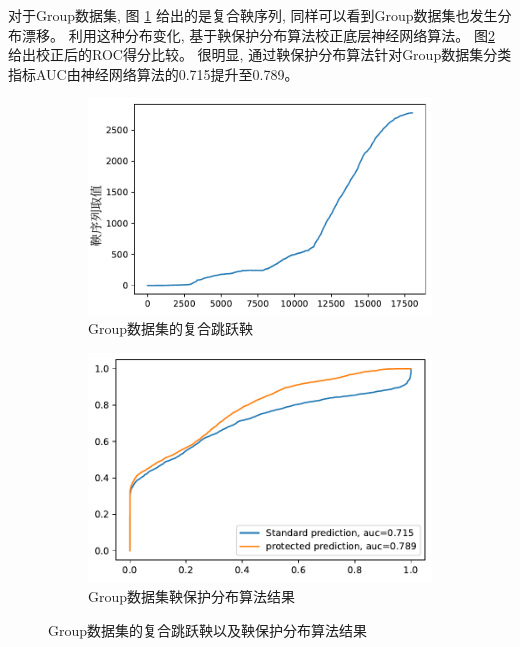 对于Group数据集, 图 \ref{mlp-jump-group} 给出的是复合鞅序列, 同样可以看到Group数据集也发生分布漂移。 利用这种分布变化, 基于鞅保护分布算法校正底层神经网络算法。 图\ref{mlp-jump-martingale-group} 给出校正后的ROC得分比较。 很明显, 通过鞅保护分布算法针对Group数据集分类指标AUC由神经网络算法的0.715提升至0.789。


\begin{figure}
     \centering
     \begin{subfigure}[b]{.45\textwidth}
         \centering
         \includegraphics[width=1\textwidth]{Img/chapter11/group-martingale-MLPClassifier}   
         \caption{Group数据集的复合跳跃鞅}
         \label{mlp-jump-group}
     \end{subfigure}
     \hfill
     \begin{subfigure}[b]{.45\textwidth}
         \centering
         \includegraphics[width=1\textwidth]{Img/chapter11/group-MLPClassifier}
         \caption{Group数据集鞅保护分布算法结果}
         \label{mlp-jump-martingale-group}
     \end{subfigure}
\caption{Group数据集的复合跳跃鞅以及鞅保护分布算法结果}
\label{fig:group}
\end{figure}

